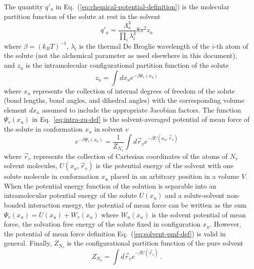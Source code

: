 \documentclass[9pt,bestpractices]{livecoms}
\begin{document}
The quantity $q'_u$ in Eq.~(\ref{eq:chemical-potential-definition}) is the molecular partition function of the solute at rest in the solvent
\begin{equation}
  q'_u = \frac{\Lambda_u^3}{\prod_i \lambda_i^3} 8 \pi^2 z_u
  \label{eq:intra-qpu-def}
\end{equation}
where $\beta = (k_B T)^{-1}$, $\lambda_i$ is the thermal De Broglie wavelength of the $i$-th atom of the solute (not the alchemical parameter as used elsewhere in this document), and $z_u$ is the intramolecular configurational partition function of the solute
\begin{equation}
  z_u = \int dx_u e^{-\beta \Psi_v(x_u)}
  \label{eq:intra-zu-def}
\end{equation}
where $x_u$ represents the collection of internal degrees of freedom of the solute (bond lengths, bond angles, and dihedral angles) with the corresponding volume element $dx_u$ assumed to include the appropriate Jacobian factors. The function $\Psi_v(x_u)$ in Eq.~\ref{eq:intra-zu-def} is the solvent-averaged potential of mean force of the solute in conformation $x_u$ in solvent $v$\cite{rouxandsimonson1999solventmodels} 
\begin{equation}
  e^{-\beta \Psi_v(x_u)} = \frac{1}{Z_{N_v}} \int d\vec{r}_v e^{-\beta U(x_u, \vec{r}_v)}
  \label{eq:solvent-pmf-def}
\end{equation}
where $\vec{r}_v$ represents the collection of Cartesian coordinates of the atoms of $N_v$ solvent molecules, $U(x_u, \vec{r}_v)$ is the potential energy of the solvent with one solute molecule in conformation $x_u$ placed in an arbitrary position in a volume $V$. When the potential energy function of the solution is separable into an intramolecular potential energy of the solute $U(x_u)$ and a solute-solvent non-bonded interaction energy, the potential of mean force can be written as the sum $\Psi_v(x_u) = U(x_u) + W_v(x_u)$ where $W_u(x_u)$ is the solvent potential of mean force, the solvation free energy of the solute fixed in configuration $x_u$\cite{gilson2007calculation}. However, the potential of mean force definition Eq.~(\ref{eq:solvent-pmf-def}) is valid in general. Finally, $Z_{N_v}$ is the configurational partition function of the pure solvent
\begin{equation}
  Z_{N_v} = \int d\vec{r}_v e^{-\beta U(\vec{r}_v)} \, .
  \label{eq:Z-pure-solvent}
\end{equation}
\end{document}
